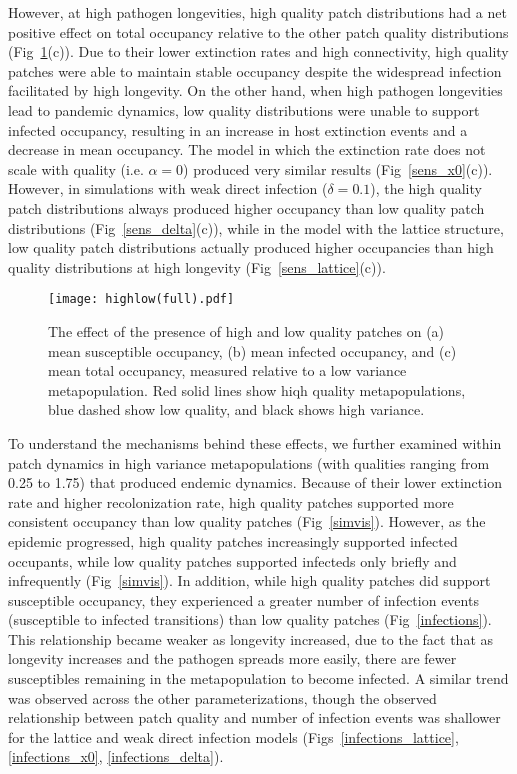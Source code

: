 \documentclass{svjour3}
\begin{document}
However, at high pathogen longevities, high quality patch distributions had a net positive effect on total occupancy relative to the other patch quality distributions (Fig~\ref{sens}(c)).  Due to their lower extinction rates and high connectivity, high quality patches were able to maintain stable occupancy despite the widespread infection facilitated by high longevity.  On the other hand, when high pathogen longevities lead to pandemic dynamics, low quality distributions were unable to support infected occupancy, resulting in an increase in host extinction events and a decrease in mean occupancy.  The model in which the extinction rate does not scale with quality (i.e. $\alpha = 0$) produced very similar results (Fig~\ref{sens_x0}(c)).  However, in simulations with weak direct infection ($\delta = 0.1$), the high quality patch distributions always produced higher occupancy than low quality patch distributions (Fig~\ref{sens_delta}(c)), while in the model with the lattice structure, low quality patch distributions actually produced higher occupancies than high quality distributions at high longevity (Fig~\ref{sens_lattice}(c)).

\begin{figure}
\centering
\texttt{[image: highlow(full).pdf]}
\caption{The effect of the presence of high and low quality patches on (a) mean susceptible occupancy, (b) mean infected occupancy, and (c) mean total occupancy, measured relative to  a low variance metapopulation.  Red solid lines show hiqh quality metapopulations, blue dashed show low quality, and black shows high variance.}
\label{sens}
\end{figure}

To understand the mechanisms behind these effects, we further examined within patch dynamics in high variance metapopulations (with qualities ranging from 0.25 to 1.75) that produced endemic dynamics.  Because of their lower extinction rate and higher recolonization rate, high quality patches supported more consistent occupancy than low quality patches (Fig~\ref{simvis}).  However, as the epidemic progressed, high quality patches increasingly supported infected occupants, while low quality patches supported infecteds only briefly and infrequently (Fig~\ref{simvis}).  In addition, while high quality patches did support susceptible occupancy, they experienced a greater number of infection events (susceptible to infected transitions) than low quality patches (Fig~\ref{infections}).  This relationship became weaker as longevity increased, due to the fact that as longevity increases and the pathogen spreads more easily, there are fewer susceptibles remaining in the metapopulation to become infected.  A similar trend was observed across the other parameterizations, though the observed relationship between patch quality and number of infection events was shallower for the lattice and weak direct infection models (Figs~\ref{infections_lattice}, \ref{infections_x0}, \ref{infections_delta}).
\end{document}
